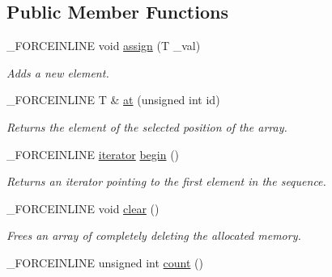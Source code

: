 \subsection*{Public Member Functions}
\begin{DoxyCompactItemize}
\item 
\hypertarget{classbt_1_1_vector_af9eae5de3fe7c4c6b37a193e169ad3ca}{\-\_\-\-F\-O\-R\-C\-E\-I\-N\-L\-I\-N\-E void \hyperlink{classbt_1_1_vector_af9eae5de3fe7c4c6b37a193e169ad3ca}{assign} (T \-\_\-val)}\label{classbt_1_1_vector_af9eae5de3fe7c4c6b37a193e169ad3ca}

\begin{DoxyCompactList}\small\item\em Adds a new element. \end{DoxyCompactList}\item 
\hypertarget{classbt_1_1_vector_a5d1b1536b1d9630dd8e4d9d3adb9dda2}{\-\_\-\-F\-O\-R\-C\-E\-I\-N\-L\-I\-N\-E T \& \hyperlink{classbt_1_1_vector_a5d1b1536b1d9630dd8e4d9d3adb9dda2}{at} (unsigned int id)}\label{classbt_1_1_vector_a5d1b1536b1d9630dd8e4d9d3adb9dda2}

\begin{DoxyCompactList}\small\item\em Returns the element of the selected position of the array. \end{DoxyCompactList}\item 
\hypertarget{classbt_1_1_vector_a5b802bbe1847dc64df3864633fc8fa51}{\-\_\-\-F\-O\-R\-C\-E\-I\-N\-L\-I\-N\-E \hyperlink{classbt_1_1_vector_1_1iterator}{iterator} \hyperlink{classbt_1_1_vector_a5b802bbe1847dc64df3864633fc8fa51}{begin} ()}\label{classbt_1_1_vector_a5b802bbe1847dc64df3864633fc8fa51}

\begin{DoxyCompactList}\small\item\em Returns an iterator pointing to the first element in the sequence. \end{DoxyCompactList}\item 
\hypertarget{classbt_1_1_vector_a26bb73e58feac452f6612eaf5273396a}{\-\_\-\-F\-O\-R\-C\-E\-I\-N\-L\-I\-N\-E void \hyperlink{classbt_1_1_vector_a26bb73e58feac452f6612eaf5273396a}{clear} ()}\label{classbt_1_1_vector_a26bb73e58feac452f6612eaf5273396a}

\begin{DoxyCompactList}\small\item\em Frees an array of completely deleting the allocated memory. \end{DoxyCompactList}\item 
\hypertarget{classbt_1_1_vector_ad7739ef12b795e71b66a603f427f64f4}{\-\_\-\-F\-O\-R\-C\-E\-I\-N\-L\-I\-N\-E unsigned int \hyperlink{classbt_1_1_vector_ad7739ef12b795e71b66a603f427f64f4}{count} ()}\label{classbt_1_1_vector_ad7739ef12b795e71b66a603f427f64f4}


\end{DoxyCompactItemize}
